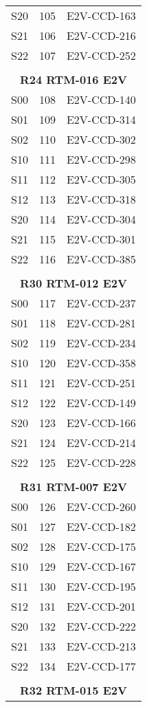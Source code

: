 \begin{longtable}{ccc}
  S20 & 105 & E2V-CCD-163 \\
  S21 & 106 & E2V-CCD-216 \\
  S22 & 107 & E2V-CCD-252 \\
 & & \\
\multicolumn{3}{c}{\bf R24  RTM-016  E2V} \\
\hline
  S00 & 108 & E2V-CCD-140 \\
  S01 & 109 & E2V-CCD-314 \\
  S02 & 110 & E2V-CCD-302 \\
  S10 & 111 & E2V-CCD-298 \\
  S11 & 112 & E2V-CCD-305 \\
  S12 & 113 & E2V-CCD-318 \\
  S20 & 114 & E2V-CCD-304 \\
  S21 & 115 & E2V-CCD-301 \\
  S22 & 116 & E2V-CCD-385 \\
 & & \\
\multicolumn{3}{c}{\bf R30  RTM-012  E2V} \\
\hline
  S00 & 117 & E2V-CCD-237 \\
  S01 & 118 & E2V-CCD-281 \\
  S02 & 119 & E2V-CCD-234 \\
  S10 & 120 & E2V-CCD-358 \\
  S11 & 121 & E2V-CCD-251 \\
  S12 & 122 & E2V-CCD-149 \\
  S20 & 123 & E2V-CCD-166 \\
  S21 & 124 & E2V-CCD-214 \\
  S22 & 125 & E2V-CCD-228 \\
 & & \\
\multicolumn{3}{c}{\bf R31  RTM-007  E2V} \\
\hline
  S00 & 126 & E2V-CCD-260 \\
  S01 & 127 & E2V-CCD-182 \\
  S02 & 128 & E2V-CCD-175 \\
  S10 & 129 & E2V-CCD-167 \\
  S11 & 130 & E2V-CCD-195 \\
  S12 & 131 & E2V-CCD-201 \\
  S20 & 132 & E2V-CCD-222 \\
  S21 & 133 & E2V-CCD-213 \\
  S22 & 134 & E2V-CCD-177 \\
 & & \\
\multicolumn{3}{c}{\bf R32  RTM-015  E2V} \\

\end{longtable}
